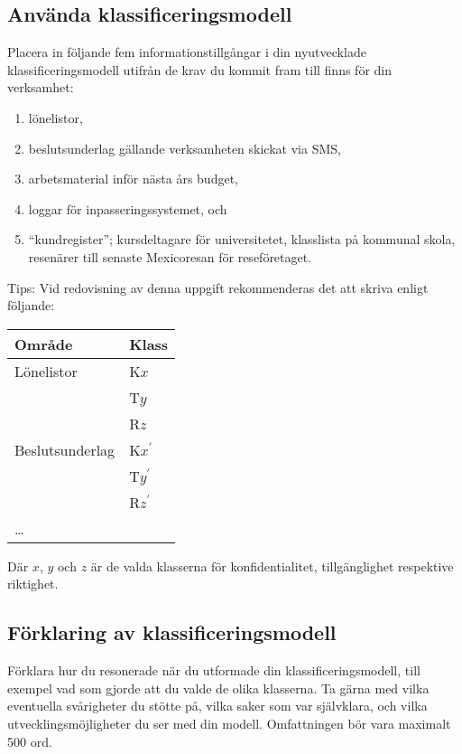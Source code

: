 \documentclass[a4paper]{llncs}
\begin{document}
\subsection{Använda klassificeringsmodell}
\label{sec:use}
\noindent
Placera in följande fem informationstillgångar i din nyutvecklade 
klassificeringsmodell utifrån de krav du kommit fram till finns för din 
verksamhet:
\begin{enumerate}
  \item lönelistor,
  \item beslutsunderlag gällande verksamheten skickat via SMS,
  \item arbetsmaterial inför nästa års budget,
  \item loggar för inpasseringssystemet, och
  \item \enquote{kundregister}; kursdeltagare för universitetet, klasslista på 
    kommunal skola, resenärer till senaste Mexicoresan för reseföretaget.
\end{enumerate}
\begin{framed}\noindent
  Tips: Vid redovisning av denna uppgift rekommenderas det att skriva enligt 
  följande:
  \begin{center}
    \begin{tabular}{ll}
      \toprule
      \textbf{Område} & \textbf{Klass} \\
      \midrule
      Lönelistor  & K\(x\) \\
                  & T\(y\) \\
                  & R\(z\) \\
      \midrule
      Beslutsunderlag & K\(x^\prime\) \\
                      & T\(y^\prime\) \\
                      & R\(z^\prime\) \\
      \midrule
      \dots \\
      \bottomrule
    \end{tabular}
  \end{center}
  Där \(x\), \(y\) och \(z\) är de valda klasserna för konfidentialitet, 
  tillgänglighet respektive riktighet.
\end{framed}

\subsection{Förklaring av klassificeringsmodell}
\label{sec:explanation}
\noindent
Förklara hur du resonerade när du utformade din klassificeringsmodell, till 
exempel vad som gjorde att du valde de olika klasserna.
Ta gärna med vilka eventuella svårigheter du stötte på, vilka saker som var 
självklara, och vilka utvecklingsmöjligheter du ser med din modell.
Omfattningen bör vara maximalt 500 ord.
\end{document}
